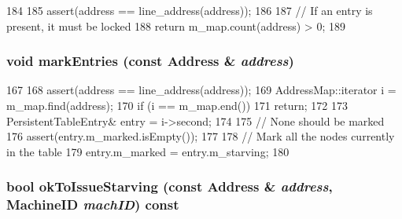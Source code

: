 \begin{DoxyCode}
184 {
185     assert(address == line_address(address));
186 
187     // If an entry is present, it must be locked
188     return m_map.count(address) > 0;
189 }
\end{DoxyCode}
\hypertarget{classPersistentTable_ae534be554d865e61002a832e0fdc2684}{
\subsubsection[{markEntries}]{\setlength{\rightskip}{0pt plus 5cm}void markEntries (const {\bf Address} \& {\em address})}}
\label{classPersistentTable_ae534be554d865e61002a832e0fdc2684}



\begin{DoxyCode}
167 {
168     assert(address == line_address(address));
169     AddressMap::iterator i = m_map.find(address);
170     if (i == m_map.end())
171         return;
172 
173     PersistentTableEntry& entry = i->second;
174 
175     // None should be marked
176     assert(entry.m_marked.isEmpty());
177 
178     // Mark all the nodes currently in the table
179     entry.m_marked = entry.m_starving;
180 }
\end{DoxyCode}
\hypertarget{classPersistentTable_a0de642e5242f4db892cdd20a693fc7e1}{
\subsubsection[{okToIssueStarving}]{\setlength{\rightskip}{0pt plus 5cm}bool okToIssueStarving (const {\bf Address} \& {\em address}, \/  {\bf MachineID} {\em machID}) const}}
\label{classPersistentTable_a0de642e5242f4db892cdd20a693fc7e1}



